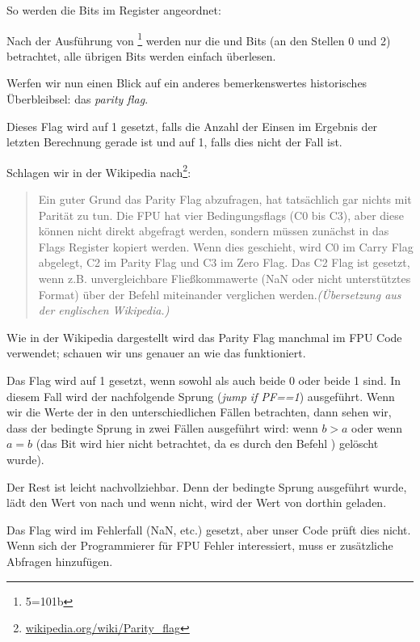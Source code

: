 

So werden die \CThreeBits Bits im \AH Register angeordnet:


Nach der Ausführung von \footnote{5=101b} werden nur die \Czero
und \Ctwo Bits (an den Stellen 0 und 2) betrachtet, alle übrigen Bits werden
einfach überlesen.

\label{parity_flag}
Werfen wir nun einen Blick auf ein anderes bemerkenswertes historisches
Überbleibsel: das \emph{parity flag}.

Dieses Flag wird auf 1 gesetzt, falls die Anzahl der Einsen im Ergebnis der
letzten Berechnung gerade ist und auf 1, falls dies nicht der Fall ist.

Schlagen wir in der Wikipedia
nach\footnote{\href{http://go.yurichev.com/17131}{wikipedia.org/wiki/Parity\_flag}}:

\begin{framed}
\begin{quotation}
Ein guter Grund das Parity Flag abzufragen, hat tatsächlich gar nichts mit
Parität zu tun. Die FPU hat vier Bedingungsflags (C0 bis C3), aber diese können
nicht direkt abgefragt werden, sondern müssen zunächst in das Flags Register
kopiert werden. Wenn dies geschieht, wird C0 im Carry Flag abgelegt, C2 im
Parity Flag und C3 im Zero Flag.
Das C2 Flag ist gesetzt, wenn z.B. unvergleichbare Fließkommawerte (NaN oder
nicht unterstütztes Format) über der \FUCOM Befehl miteinander verglichen
werden.\textit{(Übersetzung aus der englischen Wikipedia.)}
\end{quotation}
\end{framed}

Wie in der Wikipedia dargestellt wird das Parity Flag manchmal im FPU Code
verwendet; schauen wir uns genauer an wie das funktioniert.

Das \PF Flag wird auf 1 gesetzt, wenn sowohl \Czero als auch \Ctwo beide 0 oder
beide 1 sind. In diesem Fall wird der nachfolgende Sprung \JP(\emph{jump if
PF==1}) ausgeführt.
Wenn wir die Werte der \CThreeBits in den unterschiedlichen Fällen betrachten,
dann sehen wir, dass der bedingte Sprung \JP in zwei Fällen ausgeführt wird:
wenn $b>a$ oder wenn $a=b$ (das \Cthree Bit wird hier nicht betrachtet, da es
durch den Befehl ) gelöscht wurde).

Der Rest ist leicht nachvollziehbar.
Denn der bedingte Sprung ausgeführt wurde, lädt \FLD den Wert von  nach
 und wenn nicht, wird der Wert von  dorthin geladen.

Das \Ctwo Flag wird im Fehlerfall (\gls{NaN}, etc.) gesetzt, aber unser Code
prüft dies nicht. 
Wenn sich der Programmierer für FPU Fehler interessiert, muss er zusätzliche
Abfragen hinzufügen.



